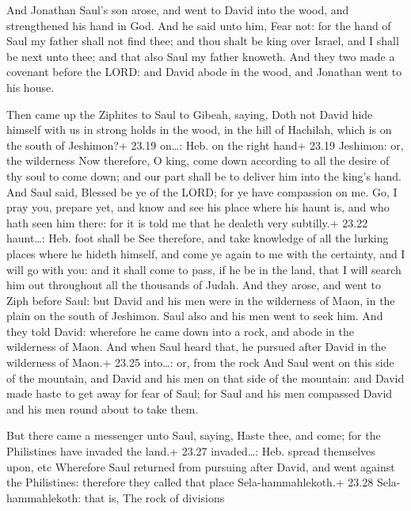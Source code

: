  And Jonathan Saul's son arose, and went to David into
the wood, and strengthened his hand in God.  And he said
unto him, Fear not: for the hand of Saul my father shall not find thee;
and thou shalt be king over Israel, and I shall be next unto thee; and
that also Saul my father knoweth.  And they two made a
covenant before the LORD: and David abode in the wood, and Jonathan went
to his house.

 Then came up the Ziphites to Saul to Gibeah, saying,
Doth not David hide himself with us in strong holds in the wood, in the
hill of Hachilah, which is on the south of Jeshimon?+ 23.19 on\ldots:
Heb. on the right hand+ 23.19 Jeshimon: or, the wilderness 
Now therefore, O king, come down according to all the desire of thy soul
to come down; and our part shall be to deliver him into the king's hand.
 And Saul said, Blessed be ye of the LORD; for ye have
compassion on me.  Go, I pray you, prepare yet, and know
and see his place where his haunt is, and who hath seen him there: for
it is told me that he dealeth very subtilly.+ 23.22 haunt\ldots: Heb.
foot shall be  See therefore, and take knowledge of all the
lurking places where he hideth himself, and come ye again to me with the
certainty, and I will go with you: and it shall come to pass, if he be
in the land, that I will search him out throughout all the thousands of
Judah.  And they arose, and went to Ziph before Saul: but
David and his men were in the wilderness of Maon, in the plain on the
south of Jeshimon.  Saul also and his men went to seek him.
And they told David: wherefore he came down into a rock, and abode in
the wilderness of Maon. And when Saul heard that, he pursued after David
in the wilderness of Maon.+ 23.25 into\ldots: or, from the rock
 And Saul went on this side of the mountain, and David and
his men on that side of the mountain: and David made haste to get away
for fear of Saul; for Saul and his men compassed David and his men round
about to take them.

 But there came a messenger unto Saul, saying, Haste
thee, and come; for the Philistines have invaded the land.+ 23.27
invaded\ldots: Heb. spread themselves upon, etc  Wherefore
Saul returned from pursuing after David, and went against the
Philistines: therefore they called that place Sela-hammahlekoth.+ 23.28
Sela-hammahlekoth: that is, The rock of divisions

